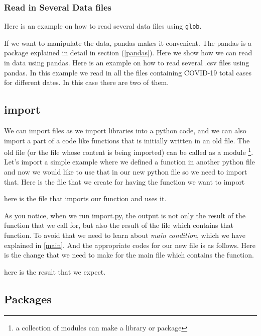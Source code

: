 \documentclass[10pt,a4paper]{article}
\newcommand{\te}{\texttt}
\begin{document}
\subsubsection{Read in Several Data files}
Here is an example on how to read several data files using \te{glob}.

If we want to manipulate the data, pandas makes it convenient.
The pandas is a package explained in detail in section (\ref{pandas}). Here we show how we can read in data using pandas. Here is an example on how to read several .csv files using pandas. In this example we read in all the files containing COVID-19 total cases for different dates. In this case there are two of them.



\subsection{import}
We can import files as we import libraries into a python code, and we can also import a part of a code like functions that is initially written in an old file. The old file (or the file whose  content is being imported) can be called as a module \footnote{a collection of modules can make a library or package}. Let's import a simple example where we defined a function in another python file and now we would like to use that in our new python file so we need to import that. Here is the file that we create for having the function we want to import

here is the file that imports our function and uses it.

As you notice, when we run import.py, the output is not only the result of the function that we call for, but also the result of the file which contains that function. To avoid that we need to learn about \textit{main condition}, which we have explained in \ref{main}. And the appropriate codes for our new file is as follows.
Here is the change that we need to make for the main file which contains the function.

here is the result that we expect.


\subsection{Packages}
\end{document}
